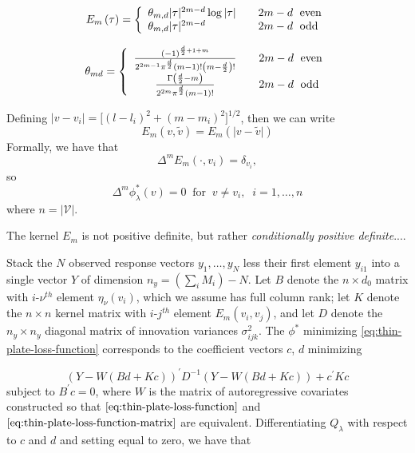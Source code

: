 \documentclass[12pt]{article}
\theoremstyle{definition}
\begin{document}
\begin{align} \label{eq:thin-plate-pseudo-kernel-1}
E_m\left( \tau \right) = \left \{ \begin{array}{ll}   \theta_{m,d} \vert \tau \vert^{2m-d}\log \vert \tau \vert  &  \quad 2m-d \mbox{\; even} \\
					   \theta_{m,d} \vert \tau \vert^{2m-d}& \quad 2m-d \mbox{\; odd} \end{array} \right.
\end{align}

\begin{align} \label{eq:thin-plate-pseudo-kernel-2}
\theta_{md} = \left \{ \begin{array}{cl}   \frac{ \left( -1 \right)^{\frac{d}{2} + 1 + m} }{ 2^{2m-1}\pi^{\frac{d}{2}}\left(m-1\right)! \left( m - \frac{d}{2} \right)! }   & \quad 2m-d \mbox{\; even} \\
					   \frac{ \Gamma\left( \frac{d}{2} - m\right) }{ 2^{2m}\pi^{\frac{d}{2}}\left(m-1\right)! }    & \quad 2m-d \mbox{\; odd} \end{array} \right.
\end{align}

Defining $\vert v - v_i \vert = \bigg[ \left( l - l_i \right)^2 + \left( m - m_i \right)^2  \bigg]^{1/2}$, then we can write 
\[
E_m\left( v,\tilde{v} \right) = E_m\left(\vert v-\tilde{v} \vert \right) 
\]
\noindent
Formally, we have that 
\[
\Delta^m E_m\left( \cdot,v_i \right) = \delta_{v_i}, 
\]
so 
\[
\Delta^m \phi^*_\lambda \left( v \right) = 0 \;\; \mbox{for}\;\;v \ne v_i, \;\;i=1,\dots, n 
\]
\noindent
where $n = \vert \mathcal{V} \vert$.

\bigskip
The kernel $E_m$ is not positive definite, but rather \emph{conditionally positive definite}....


Stack the $N$ observed response vectors $y_1,\dots, y_N$ less their first element $y_{i1}$ into a single vector $Y$ of dimension $n_y=\left(\sum \limits_{i} M_i \right) - N$.  Let $B$ denote the $n \times d_0$ matrix with $i$-$\nu^{th}$ element $\eta_\nu\left(v_i\right)$, which we assume has full column rank; let $K$ denote the $n \times n$ kernel matrix with $i$-$j^{th}$ element $E_m\left(v_i, v_j\right)$, and let $D$ denote the $n_y \times n_y$ diagonal matrix of innovation variances $\sigma^2_{ijk}$. The $\phi^*$ minimizing \ref{eq:thin-plate-loss-function} corresponds to the coefficient vectors $c$, $d$ minimizing

\begin{equation} \label{eq:thin-plate-loss-function-matrix} 
\left( Y - W \left( Bd + Kc \right) \right)^\prime D^{-1} \left( Y - W \left( Bd + Kc \right) \right) + c^\prime K c 
\end{equation} 
\noindent
subject to $B^\prime c = 0$, where $W$ is the matrix of autoregressive covariates constructed so that $\ref{eq:thin-plate-loss-function}$ and $\ref{eq:thin-plate-loss-function-matrix}$ are equivalent. 
\bigskip
Differentiating $Q_\lambda$ with respect to $c$ and $d$ and setting equal to zero, we have that 
\end{document}
